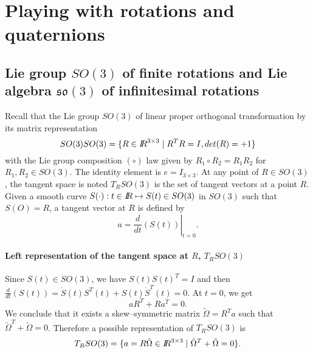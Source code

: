 \section{Playing with rotations and quaternions}
\subsection{ Lie group $SO(3)$ of finite rotations and Lie algebra $\mathfrak{so}(3)$ of infinitesimal rotations}

Recall that the Lie group $SO(3)$ of linear proper orthogonal transformation by its matrix representation
\begin{equation}SO(3)
  \label{eq:43}
  SO(3) = \{R \in \mbox{\rm $I\!\!R$}^{3\times3}\mid R^TR=I , det(R) = +1  \}
\end{equation}
with the Lie group composition $( \circ )$ law given by $R_1\circ R_2 = R_1R_2$ for $R_1,R_2\in SO(3)$. The identity element is $e = I_{3\times 3}$. At any point of $R\in SO(3)$, the tangent space is noted $T_RSO(3)$ is the set of tangent vectors at a point $R$. Given a smooth curve $S(\cdot) : t\in \mbox{\rm $I\!\!R$} \mapsto S(t)\in SO(3)$ in $SO(3)$ such that $S(O)= R$, a tangent vector at $R$ is defined by
\begin{equation}
  \label{eq:59}
  a = \left. \frac{d}{dt} (S(t)) \right|_{t=0}.
\end{equation}

\paragraph{Left representation of  the tangent space at $R$, $T_RSO(3)$ }
Since $S(t)\in SO(3)$, we have $S(t)S(t)^T=I$ and then $\frac{d}{dt} (S(t)) = \dot S(t)S^T(t) +  S(t) \dot S^T(t) =0$. At $t=0$, we get
\begin{equation}
  \label{eq:60}
 a R^T +  R a^T =0.
\end{equation}
We conclude that it exists a skew--symmetric matrix $\tilde \Omega = R^T a$ such that $\tilde \Omega^T + \tilde \Omega =0$. Therefore a possible representation of  $T_RSO(3)$ is
\begin{equation}
  \label{eq:58}
  T_RSO(3) = \{ a = R \tilde \Omega \in \mbox{\rm $I\!\!R$}^{3\times 3} \mid \tilde \Omega^T + \tilde \Omega =0 \}.
\end{equation}

